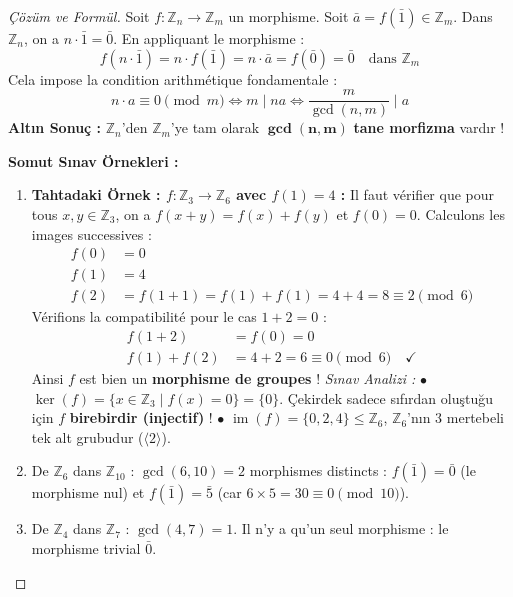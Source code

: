 \documentclass[12pt,a4paper]{report}
\begin{document}
\begin{proof}[Çözüm ve Formül]
Soit $f : \mathbb{Z}_n \to \mathbb{Z}_m$ un morphisme.  
Soit $\bar{a} = f(\bar{1}) \in \mathbb{Z}_m$.  
Dans $\mathbb{Z}_n$, on a $n \cdot \bar{1} = \bar{0}$. En appliquant le morphisme :
\[ f(n \cdot \bar{1}) = n \cdot f(\bar{1}) = n \cdot \bar{a} = f(\bar{0}) = \bar{0} \quad \text{dans } \mathbb{Z}_m \]
Cela impose la condition arithmétique fondamentale :
\[ n \cdot a \equiv 0 \pmod m \iff m \mid na \iff \frac{m}{\gcd(n, m)} \mid a \]
\textbf{Altın Sonuç :} $\mathbb{Z}_n$'den $\mathbb{Z}_m$'ye tam olarak $\mathbf{\gcd(n, m)}$ \textbf{tane morfizma} vardır !

\textbf{Somut Sınav Örnekleri :}
\begin{enumerate}
    \item \textbf{Tahtadaki Örnek : $f : \mathbb{Z}_3 \longrightarrow \mathbb{Z}_6$ avec $f(1) = 4$ :}  
    Il faut vérifier que pour tous $x, y \in \mathbb{Z}_3$, on a $f(x + y) = f(x) + f(y)$ et $f(0) = 0$.  
    Calculons les images successives :
    \begin{align*}
    f(0) &= 0 \\
    f(1) &= 4 \\
    f(2) &= f(1 + 1) = f(1) + f(1) = 4 + 4 = 8 \equiv 2 \pmod 6
    \end{align*}
    Vérifions la compatibilité pour le cas $1 + 2 = 0$ :
    \begin{align*}
    f(1 + 2) &= f(0) = 0 \\
    f(1) + f(2) &= 4 + 2 = 6 \equiv 0 \pmod 6 \quad \checkmark
    \end{align*}
    Ainsi $f$ est bien un \textbf{morphisme de groupes} !  
    \textit{Sınav Analizi :}  
    $\bullet$ $\ker(f) = \{ x \in \mathbb{Z}_3 \mid f(x) = 0 \} = \{0\}$. Çekirdek sadece sıfırdan oluştuğu için $f$ \textbf{birebirdir (injectif)} !  
    $\bullet$ $\operatorname{im}(f) = \{0, 2, 4\} \leq \mathbb{Z}_6$, $\mathbb{Z}_6$'nın 3 mertebeli tek alt grubudur ($\langle 2 \rangle$).  
    
    \item De $\mathbb{Z}_6$ dans $\mathbb{Z}_{10}$ : $\gcd(6, 10) = 2$ morphismes distincts :
    $f(\bar{1}) = \bar{0}$ (le morphisme nul) et $f(\bar{1}) = \bar{5}$ (car $6 \times 5 = 30 \equiv 0 \pmod{10}$).
    \item De $\mathbb{Z}_4$ dans $\mathbb{Z}_7$ : $\gcd(4, 7) = 1$. Il n'y a qu'un seul morphisme : le morphisme trivial $\bar{0}$.
\end{enumerate}
\end{proof}
\end{document}
